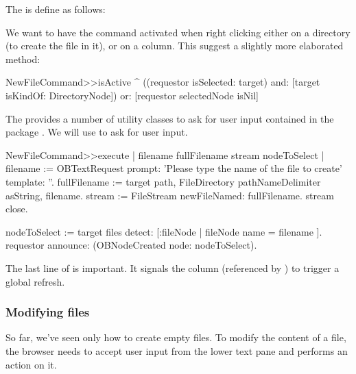 \documentclass[a4paper,10pt,twoside]{book}
\begin{document}
The  is define as follows:


We want to have the command activated when right clicking either on a directory (to create the file in it), or on a column. This suggest a slightly more elaborated  method:

\begin{code}{}    
NewFileCommand>>isActive
	^ ((requestor isSelected: target) and: [target isKindOf: DirectoryNode])
			or: [requestor selectedNode isNil]
\end{code}

The \obf provides a number of utility classes to ask for user input contained in the package . We will use  to ask for user input. 

\begin{code}{}    
NewFileCommand>>execute
	| filename fullFilename stream nodeToSelect |
	filename := OBTextRequest 
					prompt: 'Please type the name of the file to create' 
					template: ''.
	fullFilename := target path, FileDirectory pathNameDelimiter asString, filename.
	stream := FileStream newFileNamed: fullFilename.
	stream close.

	nodeToSelect := target files detect: [:fileNode | fileNode name = filename ].
	requestor announce: (OBNodeCreated node: nodeToSelect).
\end{code}

The last line of  is important. It signals the column (referenced by ) to trigger a global refresh. 


\subsubsection{Modifying files}

So far, we've seen only how to create empty files. To modify the content of a file, the browser needs to accept user input from the lower text pane and performs an action on it. 
\end{document}

